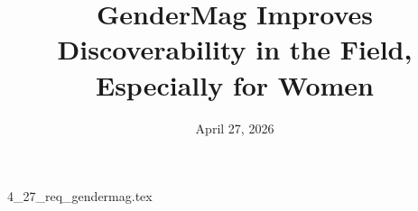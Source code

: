 \documentclass{article}      %
\title{GenderMag Improves Discoverability in the Field, Especially for Women}  %
\date{April 27, 2026}
\begin{document}

\maketitle                   %



{4_27_req_gendermag.tex}
\end{document}
